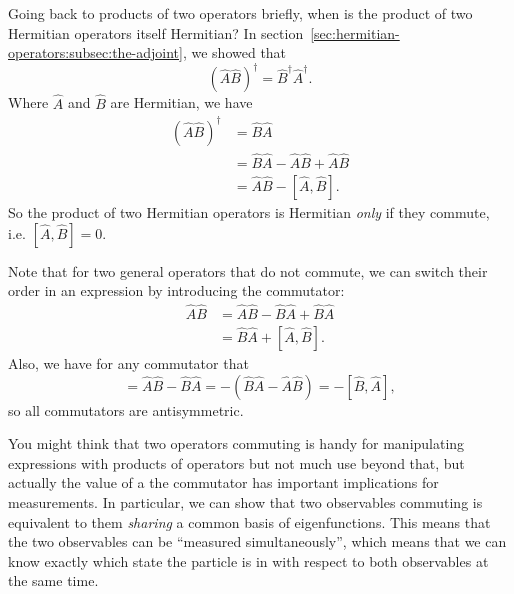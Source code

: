 \documentclass[../quantum_mechanics.tex]{subfiles}
\begin{document}
        Going back to products of two operators briefly, when is the product of two Hermitian operators itself Hermitian?
        In section~\ref{sec:hermitian-operators:subsec:the-adjoint}, we showed that
        \begin{equation}
            (\hat{A}\hat{B})^\dagger=\hat{B}^\dagger\hat{A}^\dagger.
        \end{equation}
        Where $\hat{A}$ and $\hat{B}$ are Hermitian, we have
        \begin{align}
            (\hat{A}\hat{B})^\dagger&=\hat{B}\hat{A}\\
            &=\hat{B}\hat{A}-\hat{A}\hat{B}+\hat{A}\hat{B}\\
            &=\hat{A}\hat{B}-[\hat{A},\hat{B}].
        \end{align}
        So the product of two Hermitian operators is Hermitian \textit{only} if they commute, i.e. $[\hat{A},\hat{B}]=0$.
        
        Note that for two general operators that do not commute, we can switch their order in an expression by introducing the commutator:
        \begin{align}
            \hat{A}\hat{B}&=\hat{A}\hat{B}-\hat{B}\hat{A}+\hat{B}\hat{A}\\
            &=\hat{B}\hat{A}+[\hat{A},\hat{B}].
        \end{align}
        Also, we have for any commutator that
        \begin{equation}
            [\hat{A},\hat{B}]=\hat{A}\hat{B}-\hat{B}\hat{A}=-(\hat{B}\hat{A}-\hat{A}\hat{B})=-[\hat{B},\hat{A}],
        \end{equation}
        so all commutators are antisymmetric.

        You might think that two operators commuting is handy for manipulating expressions with products of operators but not much use beyond that, but actually the value of a the commutator has important implications for measurements.
        In particular, we can show that two observables commuting is equivalent to them \textit{sharing} a common basis of eigenfunctions.
        This means that the two observables can be ``measured simultaneously'', which means that we can know exactly which state the particle is in with respect to both observables at the same time.
        
\end{document}
